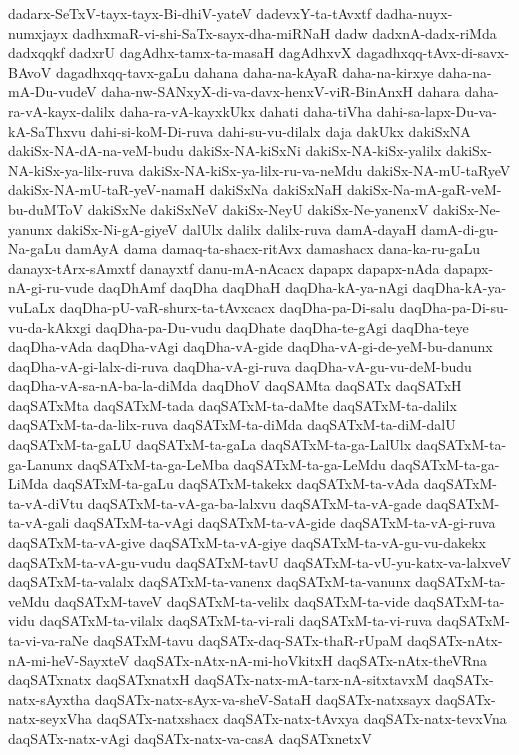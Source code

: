 {dadarx-SeTxV-tayx-tayx-Bi-dhiV-yateV
dadevxY-ta-tAvxtf
dadha-nuyx-numxjayx
dadhxmaR-vi-shi-SaTx-sayx-dha-miRNaH
dadw
dadxnA-dadx-riMda
dadxqqkf
dadxrU
dagAdhx-tamx-ta-masaH
dagAdhxvX
dagadhxqq-tAvx-di-savx-BAvoV
dagadhxqq-tavx-gaLu
dahana
daha-na-kAyaR
daha-na-kirxye
daha-na-mA-Du-vudeV
daha-nw-SANxyX-di-va-davx-henxV-viR-BinAnxH
dahara
daha-ra-vA-kayx-dalilx
daha-ra-vA-kayxkUkx
dahati
daha-tiVha
dahi-sa-lapx-Du-va-kA-SaThxvu
dahi-si-koM-Di-ruva
dahi-su-vu-dilalx
daja
dakUkx
dakiSxNA
dakiSx-NA-dA-na-veM-budu
dakiSx-NA-kiSxNi
dakiSx-NA-kiSx-yalilx
dakiSx-NA-kiSx-ya-lilx-ruva
dakiSx-NA-kiSx-ya-lilx-ru-va-neMdu
dakiSx-NA-mU-taRyeV
dakiSx-NA-mU-taR-yeV-namaH
dakiSxNa
dakiSxNaH
dakiSx-Na-mA-gaR-veM-bu-duMToV
dakiSxNe
dakiSxNeV
dakiSx-NeyU
dakiSx-Ne-yanenxV
dakiSx-Ne-yanunx
dakiSx-Ni-gA-giyeV
dalUlx
dalilx
dalilx-ruva
damA-dayaH
damA-di-gu-Na-gaLu
damAyA
dama
damaq-ta-shacx-ritAvx
damashacx
dana-ka-ru-gaLu
danayx-tArx-sAmxtf
danayxtf
danu-mA-nAcacx
dapapx
dapapx-nAda
dapapx-nA-gi-ru-vude
daqDhAmf
daqDha
daqDhaH
daqDha-kA-ya-nAgi
daqDha-kA-ya-vuLaLx
daqDha-pU-vaR-shurx-ta-tAvxcacx
daqDha-pa-Di-salu
daqDha-pa-Di-su-vu-da-kAkxgi
daqDha-pa-Du-vudu
daqDhate
daqDha-te-gAgi
daqDha-teye
daqDha-vAda
daqDha-vAgi
daqDha-vA-gide
daqDha-vA-gi-de-yeM-bu-danunx
daqDha-vA-gi-lalx-di-ruva
daqDha-vA-gi-ruva
daqDha-vA-gu-vu-deM-budu
daqDha-vA-sa-nA-ba-la-diMda
daqDhoV
daqSAMta
daqSATx
daqSATxH
daqSATxMta
daqSATxM-tada
daqSATxM-ta-daMte
daqSATxM-ta-dalilx
daqSATxM-ta-da-lilx-ruva
daqSATxM-ta-diMda
daqSATxM-ta-diM-dalU
daqSATxM-ta-gaLU
daqSATxM-ta-gaLa
daqSATxM-ta-ga-LalUlx
daqSATxM-ta-ga-Lanunx
daqSATxM-ta-ga-LeMba
daqSATxM-ta-ga-LeMdu
daqSATxM-ta-ga-LiMda
daqSATxM-ta-gaLu
daqSATxM-takekx
daqSATxM-ta-vAda
daqSATxM-ta-vA-diVtu
daqSATxM-ta-vA-ga-ba-lalxvu
daqSATxM-ta-vA-gade
daqSATxM-ta-vA-gali
daqSATxM-ta-vAgi
daqSATxM-ta-vA-gide
daqSATxM-ta-vA-gi-ruva
daqSATxM-ta-vA-give
daqSATxM-ta-vA-giye
daqSATxM-ta-vA-gu-vu-dakekx
daqSATxM-ta-vA-gu-vudu
daqSATxM-tavU
daqSATxM-ta-vU-yu-katx-va-lalxveV
daqSATxM-ta-valalx
daqSATxM-ta-vanenx
daqSATxM-ta-vanunx
daqSATxM-ta-veMdu
daqSATxM-taveV
daqSATxM-ta-velilx
daqSATxM-ta-vide
daqSATxM-ta-vidu
daqSATxM-ta-vilalx
daqSATxM-ta-vi-rali
daqSATxM-ta-vi-ruva
daqSATxM-ta-vi-va-raNe
daqSATxM-tavu
daqSATx-daq-SATx-thaR-rUpaM
daqSATx-nAtx-nA-mi-heV-SayxteV
daqSATx-nAtx-nA-mi-hoVkitxH
daqSATx-nAtx-theVRna
daqSATxnatx
daqSATxnatxH
daqSATx-natx-mA-tarx-nA-sitxtavxM
daqSATx-natx-sAyxtha
daqSATx-natx-sAyx-va-sheV-SataH
daqSATx-natxsayx
daqSATx-natx-seyxVha
daqSATx-natxshacx
daqSATx-natx-tAvxya
daqSATx-natx-tevxVna
daqSATx-natx-vAgi
daqSATx-natx-va-casA
daqSATxnetxV
}
